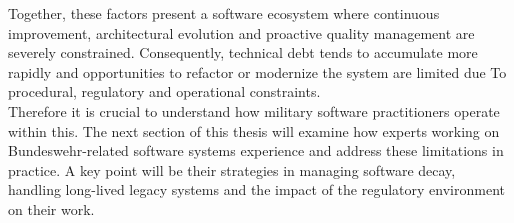 Together, these factors present a software ecosystem where continuous improvement, architectural evolution and proactive quality management are severely constrained. Consequently, technical debt tends to accumulate more rapidly and opportunities to refactor or modernize the system are limited due To
procedural, regulatory and operational constraints.\\

Therefore it is crucial to understand how military software practitioners operate within this. The next section of this thesis will examine how experts working on Bundeswehr-related software systems experience and address these limitations in practice.
A key point will be their strategies in managing software decay, handling long-lived legacy systems and the impact of the regulatory environment on their work.